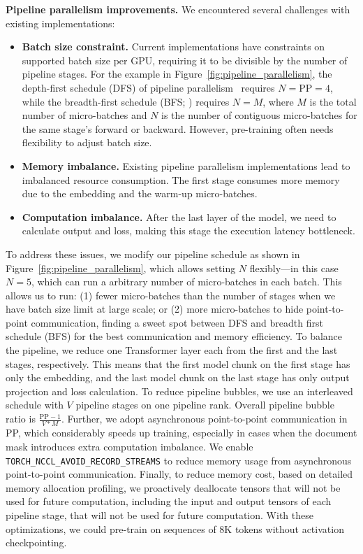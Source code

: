 \textbf{Pipeline parallelism improvements.}
We encountered several challenges with existing implementations:

\begin{itemize}
    \item \textbf{Batch size constraint.} Current implementations have constraints on supported batch size per GPU, requiring it to be divisible by the number of pipeline stages. For the example in Figure~\ref{fig:pipeline_parallelism}, the depth-first schedule (DFS) of pipeline parallelism~\citep{narayanan2021efficient} requires $N=\textrm{PP}=4$, while the breadth-first schedule (BFS; \citet{lamy2023breadth}) requires $N=M$, where $M$ is the total number of micro-batches and $N$ is the number of contiguous micro-batches for the same stage's forward or backward. However, pre-training often needs flexibility to adjust batch size.
    
    \item \textbf{Memory imbalance.} Existing pipeline parallelism implementations lead to imbalanced resource consumption. The first stage consumes more memory due to the embedding and the warm-up micro-batches.
    
    \item \textbf{Computation imbalance.} After the last layer of the model, we need to calculate output and loss, making this stage the execution latency bottleneck.
\end{itemize} 

To address these issues, we modify our pipeline schedule as shown in Figure~\ref{fig:pipeline_parallelism}, which allows setting $N$ flexibly---in this case $N=5$, which can run a arbitrary number of micro-batches in each batch. This allows us to run: (1) fewer micro-batches than the number of stages when we have batch size limit at large scale; or (2) more micro-batches to hide point-to-point communication, finding a sweet spot between DFS and breadth first schedule (BFS) for the best communication and memory efficiency. To balance the pipeline, we reduce one Transformer layer each from the first and the last stages, respectively. This means that the first model chunk on the first stage has only the embedding, and the last model chunk on the last stage has only output projection and loss calculation. To reduce pipeline bubbles, we use an interleaved schedule \citep{narayanan2021efficient} with $V$ pipeline stages on one pipeline rank. Overall pipeline bubble ratio is $\frac{\textrm{PP} - 1}{V * M}$. Further, we adopt asynchronous point-to-point communication in PP, which considerably speeds up training, especially in cases when the document mask introduces extra computation imbalance. We enable {\small \texttt{TORCH\_NCCL\_AVOID\_RECORD\_STREAMS}} to reduce memory usage from asynchronous point-to-point communication. Finally, to reduce memory cost, based on detailed memory allocation profiling, we proactively deallocate tensors that will not be used for future computation, including the input and output tensors of each pipeline stage, that will not be used for future computation. With these optimizations, we could pre-train \llamathree on sequences of 8K tokens without activation checkpointing.

